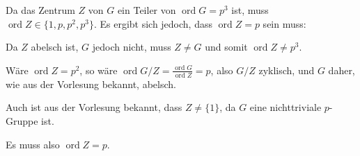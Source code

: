 \documentclass[a4paper,10pt]{article}
\theoremstyle{definition}
\newcommand{\ord}{\operatorname{ord}}
\begin{document}
\section{}
Da das Zentrum $Z$ von $G$ ein Teiler von $\ord G = p^3$ ist, muss $\ord Z \in \{1, p, p^2, p^3\}$. Es ergibt sich jedoch, dass $\ord Z = p$ sein muss:

Da $Z$ abelsch ist, $G$ jedoch nicht, muss $Z \neq G$ und somit $\ord Z \neq p^3$.

Wäre $\ord Z = p^2$, so wäre $\ord G/Z = \frac{\ord G}{\ord Z} = p$, also $G/Z$ zyklisch, und $G$ daher, wie aus der Vorlesung bekannt, abelsch.

Auch ist aus der Vorlesung bekannt, dass $Z \neq \{1\}$, da $G$ eine nichttriviale $p$-Gruppe ist.

Es muss also $\ord Z = p$.
\end{document}

